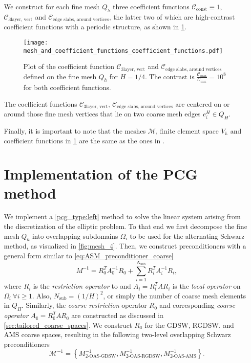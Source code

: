 We construct for each fine mesh $Q_h$ three coefficient functions $\mathcal{C}_{\text{const}}\equiv 1$, $\mathcal{C}_{\text{3layer, vert}}$ and $\mathcal{C}_{\text{edge slabs, around vertices}}$, the latter two of which are high-contrast coefficient functions with a periodic structure, as shown in \cref{fig:coefficient_functions}. 
\begin{figure}[H]
    \texttt{[image: mesh\_and\_coefficient\_functions\_coefficient\_functions.pdf]}
    \caption{Plot of the coefficient function $\mathcal{C}_{\text{3layer, vert}}$ and $\mathcal{C}_{\text{edge slabs, around vertices}}$ defined on the fine mesh $Q_h$ for $H=1/4$. The contrast is $\frac{\mathcal{C}_{\text{max}}}{\mathcal{C}_{\text{min}}} = 10^8$ for both coefficient functions.}
    \label{fig:coefficient_functions}
\end{figure}
The coefficient functions $\mathcal{C}_{\text{3layer, vert}}$, $\mathcal{C}_{\text{edge slabs, around vertices}}$ are centered on or around those fine mesh vertices that lie on two coarse mesh edges $e_i^H\in Q_H$.

Finally, it is important to note that the meshes $\mathcal{M}$, finite element space $V_h$ and coefficient functions in \cref{fig:coefficient_functions} are the same as the ones in \cite{ams_coarse_space_comp_study_Alves2024}.

\section{Implementation of the PCG method}\label{sec:implementation_pcg}
We implement a \ref{pcg_type:left} method to solve the linear system arising from the discretization of the elliptic problem. To that end we first decompose the fine mesh $Q_h$ into overlapping subdomains $\Omega_i$ to be used for the alternating Schwarz method, as visualized in \cref{fig:mesh_4}. Then, we construct preconditioners with a general form similar to \cref{eq:ASM_preconditioner_coarse}
\[
    M^{-1} = R_0^T A_0^{-1} R_0 + \sum_{i=1}^{N_{\text{sub}}} R_i^T A_i^{-1} R_i,
\]
where $R_i$ is the \textit{restriction operator} to and $A_i = R_i^T A R_i$ is the \textit{local operator} on $\Omega_i \ \forall i \geq 1$. Also, $N_{\text{sub}} = (1/H)^2$, or simply the number of coarse mesh elements in $Q_H$. Similarly, the \textit{coarse restriction} operator $R_0$ and corresponding \textit{coarse operator} $A_0 = R_0^T A R_0$ are constructed as discussed in \cref{sec:tailored_coarse_spaces}. We construct $R_0$ for the GDSW, RGDSW, and AMS coarse spaces, resulting in the following two-level overlapping Schwarz preconditioners
\begin{equation}
    \mathcal{M}^{-1} =  \left\{M^{-1}_{\text{2-OAS-GDSW}}, M^{-1}_{\text{2-OAS-RGDSW}}, M^{-1}_{\text{2-OAS-AMS}}\right\}.
    \label{eq:preconditioners}
\end{equation}